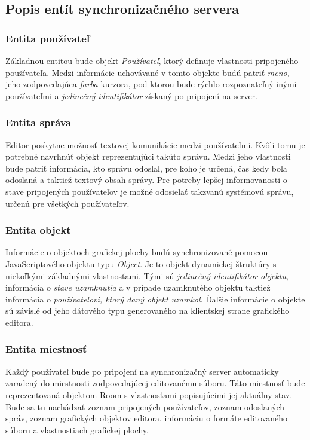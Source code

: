 \subsection{Popis entít synchronizačného servera}
\subsubsection{Entita používateľ}

Základnou entitou bude objekt \textit{Používateľ}, ktorý definuje vlastnosti pripojeného používateľa. Medzi informácie uchovávané v tomto objekte budú patriť \textit{meno}, jeho zodpovedajúca \textit{farba} kurzora, pod ktorou bude rýchlo rozpoznateľný inými používateľmi a \textit{jedinečný identifikátor} získaný po pripojení na server.

\subsubsection{Entita správa}
Editor poskytne možnosť textovej komunikácie medzi používateľmi. Kvôli tomu je potrebné navrhnúť objekt reprezentujúci takúto správu. Medzi jeho vlastnosti bude patriť informácia, kto správu odoslal, pre koho je určená, čas kedy bola odoslaná a taktiež textový obsah správy. Pre potreby lepšej informovanosti o stave pripojených používateľov je možné odosielať takzvanú systémovú správu, určenú pre všetkých používateľov.

\subsubsection{Entita objekt}
Informácie o objektoch grafickej plochy budú synchronizované pomocou JavaScriptového objektu typu \textit{Object}. Je to objekt dynamickej štruktúry s niekoľkými základnými vlastnosťami. Tými sú \textit{jedinečný identifikátor objektu}, informácia o \textit{stave uzamknutia} a v prípade uzamknutého objektu taktiež informácia o \textit{používateľovi, ktorý daný objekt uzamkol}. Ďalšie informácie o objekte sú závislé od jeho dátového typu generovaného na klientskej strane grafického editora.

\subsubsection{Entita miestnosť}
Každý používateľ bude po pripojení na synchronizačný server automaticky zaradený do miestnosti zodpovedajúcej editovanému súboru. Táto miestnosť bude reprezentovaná objektom Room s vlastnosťami popisujúcimi jej aktuálny stav. Bude sa tu nachádzať zoznam pripojených používateľov, zoznam odoslaných správ, zoznam grafických objektov editora, informáciu o formáte editovaného súboru a vlastnostiach grafickej plochy.

